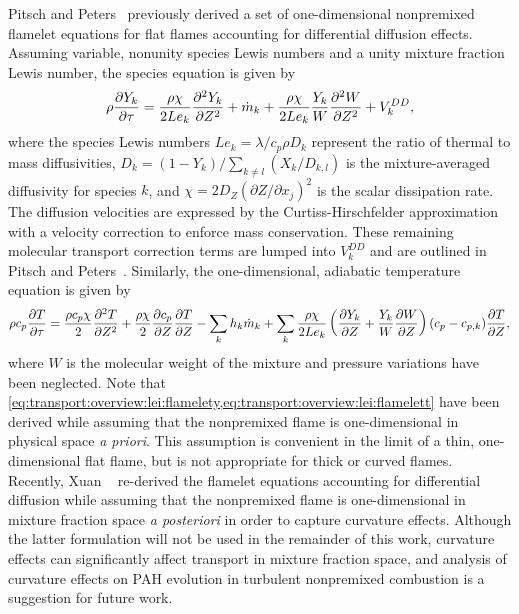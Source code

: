 Pitsch and Peters~\cite{pitsch1998} previously derived a set of one-dimensional nonpremixed flamelet equations for flat flames accounting for differential diffusion effects. Assuming variable, nonunity species Lewis numbers and a unity mixture fraction Lewis number, the species equation is given by
\begin{equation}\label{eq:transport:overview:lei:flamelety}
  \rho\pder[Y_k]{\tau} = \frac{\rho\chi}{2 Le_k}\sder[Y_k]{Z} + \dot{m}_k + \frac{\rho\chi}{2 Le_k}\frac{Y_k}{W}\sder[W]{Z} + V_k^{DD},
\end{equation}
where the species Lewis numbers $Le_k = \lambda/c_p\rho D_k$ represent the ratio of thermal to mass diffusivities, $D_k = (1 - Y_k)/\sum\limits_{k \neq l} (X_k/D_{k,l})$ is the mixture-averaged diffusivity for species $k$, and $\chi = 2D_Z(\partial Z/\partial x_j)^2$ is the scalar dissipation rate. The diffusion velocities are expressed by the Curtiss-Hirschfelder approximation~\cite{curtiss1949} with a velocity correction to enforce mass conservation. These remaining molecular transport correction terms are lumped into $V_k^{DD}$ and are outlined in Pitsch and Peters~\cite{pitsch1998}. Similarly, the one-dimensional, adiabatic temperature equation is given by
\begin{equation}\label{eq:transport:overview:lei:flamelett}
  \rho c_p \pder[T]{\tau} = \frac{\rho c_p \chi}{2}\sder[T]{Z} + \frac{\rho\chi}{2}\pder[c_p]{Z}\pder[T]{Z} - \sum\limits_{k} h_k\dot{m}_k + \sum\limits_{k} \frac{\rho\chi}{2 Le_k}\left( \pder[Y_k]{Z} + \frac{Y_k}{W}\pder[W]{Z} \right)(c_p - c_{p,k})\pder[T]{Z},
\end{equation}
where $W$ is the molecular weight of the mixture and pressure variations have been neglected. Note that \cref{eq:transport:overview:lei:flamelety,eq:transport:overview:lei:flamelett} have been derived while assuming that the nonpremixed flame is one-dimensional in physical space \textit{a priori}. This assumption is convenient in the limit of a thin, one-dimensional flat flame, but is not appropriate for thick or curved flames. Recently, Xuan \etal~\cite{xuan2014} re-derived the flamelet equations accounting for differential diffusion while assuming that the nonpremixed flame is one-dimensional in mixture fraction space \textit{a posteriori} in order to capture curvature effects. Although the latter formulation will not be used in the remainder of this work, curvature effects can significantly affect transport in mixture fraction space, and analysis of curvature effects on PAH evolution in turbulent nonpremixed combustion is a suggestion for future work.

